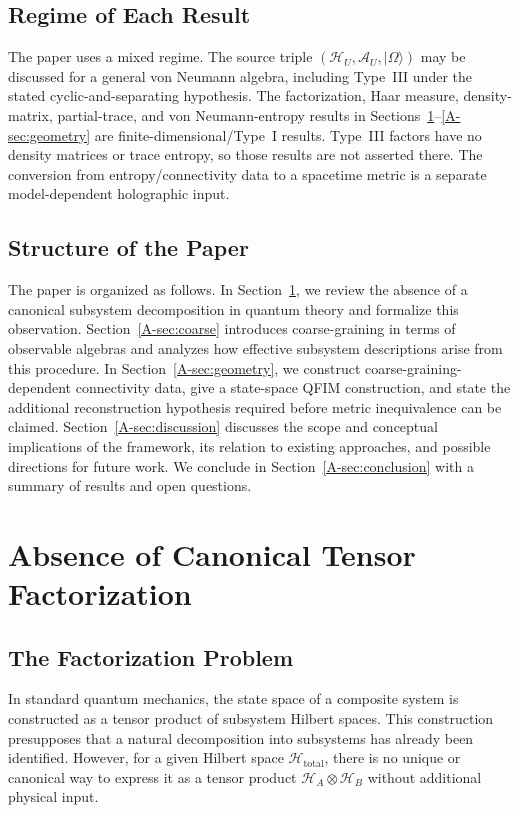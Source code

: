 \documentclass[12pt,a4paper,openany]{book}
\begin{document}
\subsection{Regime of Each Result}

The paper uses a mixed regime.  The source triple $(\mathcal H_U,\mathcal A_U,|\Omega\rangle)$ may be discussed for a general von Neumann algebra, including Type~III under the stated cyclic-and-separating hypothesis.  The factorization, Haar measure, density-matrix, partial-trace, and von Neumann-entropy results in Sections~\ref{A-sec:nopref}--\ref{A-sec:geometry} are finite-dimensional/Type~I results.  Type~III factors have no density matrices or trace entropy, so those results are not asserted there.  The conversion from entropy/connectivity data to a spacetime metric is a separate model-dependent holographic input.

\subsection{Structure of the Paper}

The paper is organized as follows.
In Section~\ref{A-sec:nopref}, we review the absence of a canonical subsystem decomposition in quantum theory and formalize this observation.
Section~\ref{A-sec:coarse} introduces coarse-graining in terms of observable algebras and analyzes how effective subsystem descriptions arise from this procedure.
In Section~\ref{A-sec:geometry}, we construct coarse-graining-dependent connectivity data, give a state-space QFIM construction, and state the additional reconstruction hypothesis required before metric inequivalence can be claimed.
Section~\ref{A-sec:discussion} discusses the scope and conceptual implications of the framework, its relation to existing approaches, and possible directions for future work.
We conclude in Section~\ref{A-sec:conclusion} with a summary of results and open questions.

\section{Absence of Canonical Tensor Factorization}
\label{A-sec:nopref}

\subsection{The Factorization Problem}

In standard quantum mechanics, the state space of a composite system is constructed as a tensor product of subsystem Hilbert spaces. 
This construction presupposes that a natural decomposition into subsystems has already been identified. 
However, for a given Hilbert space $\mathcal{H}_{\text{total}}$, there is no unique or canonical way to express it as a tensor product $\mathcal{H}_A \otimes \mathcal{H}_B$ without additional physical input.
\end{document}
